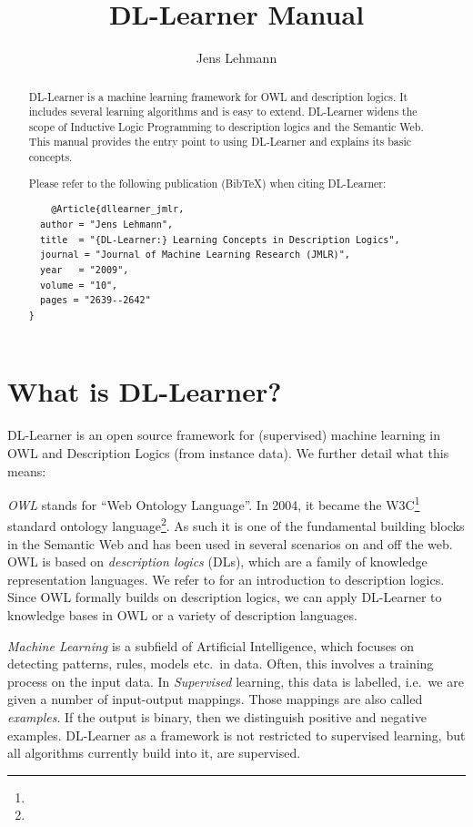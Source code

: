 \documentclass[a4paper,12pt]{scrartcl}
\title{DL-Learner Manual}
\author{Jens Lehmann}
\begin{document}
\maketitle

\begin{abstract}
\vspace{-15pt}
DL-Learner is a machine learning framework for OWL and description logics. It includes several learning algorithms and is easy to extend. DL-Learner widens the scope of Inductive Logic Programming to description logics and the Semantic Web. This manual provides the entry point to using DL-Learner and explains its basic concepts.

Please refer to the following publication (BibTeX) when citing DL-Learner:
\begin{verbatim}
	@Article{dllearner_jmlr,
  author = "Jens Lehmann",
  title  = "{DL-Learner:} Learning Concepts in Description Logics",
  journal = "Journal of Machine Learning Research (JMLR)",
  year   = "2009",
  volume = "10",
  pages = "2639--2642"
}
\end{verbatim}
\end{abstract}

\clearpage 

\tableofcontents

\clearpage

\section{What is DL-Learner?}
\label{sec:whatis}

DL-Learner is an open source framework for (supervised) machine learning in OWL and Description Logics (from instance data). We further detail what this means:

\emph{OWL} stands for ``Web Ontology Language''. In 2004, it became the W3C\footnote{\wwwc} standard ontology language\footnote{\owl}. As such it is one of the fundamental building blocks in the Semantic Web and has been used in several scenarios on and off the web. OWL is based on \emph{description logics} (DLs), which are a family of knowledge representation languages. We refer to \cite{dlhb} for an introduction to description logics. Since OWL formally builds on description logics, we can apply DL-Learner to knowledge bases in OWL or a variety of description languages.

\emph{Machine Learning} is a subfield of Artificial Intelligence, which focuses on detecting patterns, rules, models etc.~in data. Often, this involves a training process on the input data. In \emph{Supervised} learning, this data is labelled, i.e.~we are given a number of input-output mappings. Those mappings are also called \emph{examples}. If the output is binary, then we distinguish positive and negative examples. DL-Learner as a framework is not restricted to supervised learning, but all algorithms currently build into it, are supervised.
\end{document}
